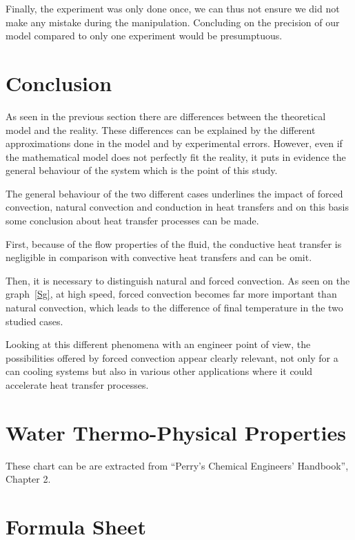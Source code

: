 \documentclass{report}
\begin{document}
	Finally, the experiment was only done once, we can thus not ensure we did not make any mistake during the manipulation. Concluding on the precision of our model compared to only one experiment would be presumptuous.

	\chapter{Conclusion}\label{ccl}
	
	As seen in the previous section there are differences between the theoretical model and the reality. These differences can be explained by the different approximations done in the model and by experimental errors. However, even if the mathematical model does not perfectly fit the reality, it puts in evidence the general behaviour of the system which is the point of this study.

	The general behaviour of the two different cases underlines the impact of forced convection, natural convection and conduction in heat transfers and on this basis some conclusion about heat transfer processes can be made.
	
	First, because of the flow properties of the fluid, the conductive heat transfer is negligible in comparison with convective heat transfers and can be omit.
	
	Then, it is necessary to distinguish natural and forced convection. As seen on the graph~\ref{Sg}, at high speed, forced convection becomes far more important than natural convection, which leads to the difference of final temperature in the two studied cases.
	
	Looking at this different phenomena with an engineer point of view, the possibilities offered by forced convection appear clearly relevant, not only for a can cooling systems but also in various other applications where it could accelerate heat transfer processes.
	
	\appendix

	\chapter{Water Thermo-Physical Properties}\label{WTPP}
	
	These chart can be are extracted from ``Perry’s	Chemical Engineers’ Handbook'', Chapter 2\cite{properties}.
	
	
	
	\chapter{Formula Sheet}\label{FORMU}
	
\end{document}
